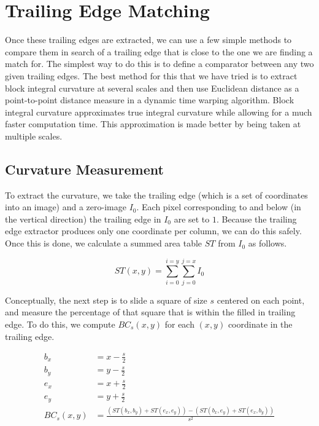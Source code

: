 \section{Trailing Edge Matching}

Once these trailing edges are extracted, we can use a few simple methods to compare them in search of a trailing edge that is close to the one we are finding a match for.
The simplest way to do this is to define a comparator between any two given trailing edges.
The best method for this that we have tried is to extract block integral curvature at several scales and then use Euclidean distance as a point-to-point distance measure in a dynamic time warping algorithm.
Block integral curvature approximates true integral curvature while allowing for a much faster computation time.
This approximation is made better by being taken at multiple scales.

\subsection{Curvature Measurement}

To extract the curvature, we take the trailing edge (which is a set of coordinates into an image) and a zero-image $I_0$.
Each pixel corresponding to and below (in the vertical direction) the trailing edge in $I_0$ are set to $1$.
Because the trailing edge extractor produces only one coordinate per column, we can do this safely.
Once this is done, we calculate a summed area table \cite{crow1984summed} $ST$ from $I_0$ as follows.

\begin{equation}
ST(x,y) = \sum_{i=0}^{i=y}\sum_{j=0}^{j=x} I_0 
\end{equation}

Conceptually, the next step is to slide a square of size $s$ centered on each point, and measure the percentage of that square that is within the filled in trailing edge.
To do this, we compute $BC_s(x, y)$ for each $(x, y)$ coordinate in the trailing edge.

\begin{align}
b_x &= x - \frac{s}{2}\\
b_y &= y - \frac{s}{2}\\
e_x &= x + \frac{s}{2}\\
e_y &= y + \frac{s}{2}\\
BC_s(x,y) &= \frac{(ST(b_x, b_y) + ST(e_x, e_y)) - (ST(b_x, e_y) + ST(e_x, b_y))}{s^2}
\end{align}

